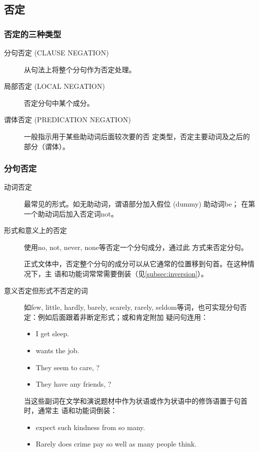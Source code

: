 \subsection{否定}

\subsubsection{否定的三种类型}
\begin{description}
\item[分句否定 (CLAUSE NEGATION)] 从句法上将整个分句作为否定处理。

\item[局部否定 (LOCAL NEGATION)] 否定分句中某个成分。

\item[谓体否定 (PREDICATION NEGATION)] 一般指示用于某些助动词后面较次要的否
  定类型，否定主要动词及之后的部分（谓体）。
\end{description}

\subsubsection{分句否定}

\begin{description}
\item[动词否定] 最常见的形式。如无助动词，谓语部分加入假位 (dummy) 助动词be；
  在第一个助动词后加入否定词not。

\item[形式和意义上的否定] 使用no, not, never, none等否定一个分句成分，通过此
  方式来否定分句。

  正式文体中，否定整个分句的成分可以从它通常的位置移到句首。在这种情况下，主
  语和功能词常常需要倒装（见\cref{subsec:inversion}）。


\item[意义否定但形式不否定的词] 如few, little, hardly, barely, scarely,
  rarely, seldom等词，也可实现分句否定：例如后面跟着非断定形式；或和肯定附加
  疑问句连用：
  \begin{itemize}
  \item I  get  sleep.

  \item {} wants the job.

  \item They  seem to care, ?

  \item They  have any friends, ?
  \end{itemize}

  当这些副词在文学和演说题材中作为状语或作为状语中的修饰语置于句首时，通常主
  语和功能词倒装：
  \begin{itemize}
  \item {} expect such kindness from so many.

  \item Rarely does crime pay so well as many people think.
  \end{itemize}
\end{description}

